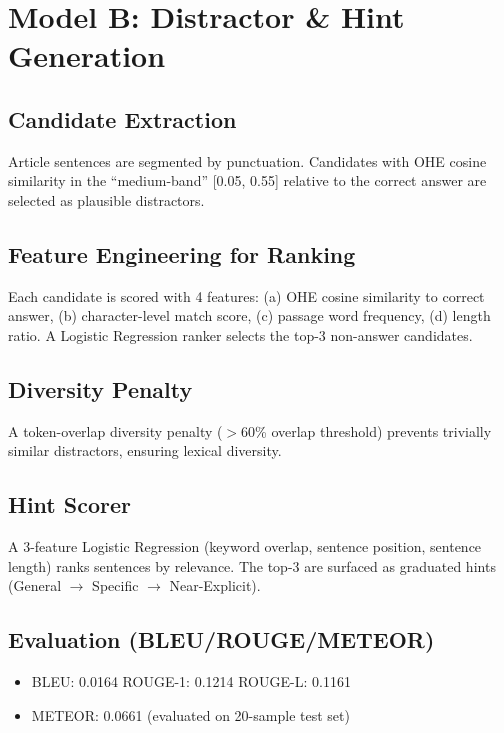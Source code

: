 \documentclass[10pt,twocolumn]{article}
\begin{document}
\section{Model B: Distractor \& Hint Generation}

\subsection*{Candidate Extraction}
Article sentences are segmented by punctuation. Candidates with OHE cosine similarity in the ``medium-band'' [0.05, 0.55] relative to the correct answer are selected as plausible distractors.

\subsection*{Feature Engineering for Ranking}
Each candidate is scored with 4 features: (a) OHE cosine similarity to correct answer, (b) character-level match score, (c) passage word frequency, (d) length ratio. A Logistic Regression ranker selects the top-3 non-answer candidates.

\subsection*{Diversity Penalty}
A token-overlap diversity penalty ($>$60\% overlap threshold) prevents trivially similar distractors, ensuring lexical diversity.

\subsection*{Hint Scorer}
A 3-feature Logistic Regression (keyword overlap, sentence position, sentence length) ranks sentences by relevance. The top-3 are surfaced as graduated hints (General $\to$ Specific $\to$ Near-Explicit).

\subsection*{Evaluation (BLEU/ROUGE/METEOR)}
\begin{itemize}
    \item BLEU: 0.0164 \quad ROUGE-1: 0.1214 \quad ROUGE-L: 0.1161
    \item METEOR: 0.0661 (evaluated on 20-sample test set)
\end{itemize}

\end{document}
